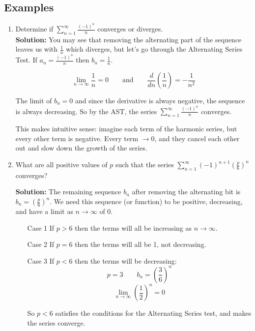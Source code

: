 \documentclass[12pt]{report}
\begin{document}
\subsection*{Examples}
\begin{enumerate}

	\item Determine if $ \sum_{n=1}^{\infty} \frac{(-1)^n}{n} $ converges or diverges. \\
	
	\textbf{Solution:} You may see that removing the alternating part of the sequence leaves us with $ \frac{1}{n} $ which diverges, but let's go through the Alternating Series Test. If $ a_n = \frac{(-1)^n}{n} $ then $ b_n = \frac{1}{n} $.
	
	$$
		\lim_{n\to\infty} \frac{1}{n} = 0
		\quad \quad \text{and} \quad \quad
		\frac{d}{dn} \left( \frac{1}{n} \right) = -\frac{1}{n^2}
	$$

	The limit of $ b_n = 0 $ and since the derivative is always negative, the sequence is always decreasing. So by the AST, the series $ \sum_{n=1}^{\infty} \frac{(-1)^n}{n} $ converges.
	
	This makes intuitive sense: imagine each term of the harmonic series, but every other term is negative. Every term $ \to 0 $, and they cancel each other out and slow down the growth of the series. 



	\item What are all positive values of $ p $ such that the series $ \sum_{n=1}^{\infty} (-1)^{n+1} \left( \frac{p}{6} \right)^n $ converges?
	
	\textbf{Solution:} The remaining sequence $ b_n $ after removing the alternating bit is $ b_n = \left( \frac{p}{6} \right)^n $. We need this sequence (or function) to be positive, decreasing, and have a limit as $ n\to\infty $ of 0.
	
	\begin{itemize}
		\item[Case 1] \quad If $ p > 6 $ then the terms will all be increasing as $ n\to\infty $.
		\item[Case 2] \quad If $ p = 6 $ then the terms will all be 1, not decreasing.
		\item[Case 3] \quad If $ p < 6 $ then the terms will be decreasing:
		$$
			p = 3 \quad \quad
			b_n = \left( \frac{3}{6} \right)^n
		$$
		$$ \lim_{n\to\infty} \left( \frac{1}{2} \right)^n = 0 $$
		
		So $ p < 6 $ satisfies the conditions for the Alternating Series test, and makes the series converge. 
	\end{itemize}
	
\end{enumerate}
\end{document}
